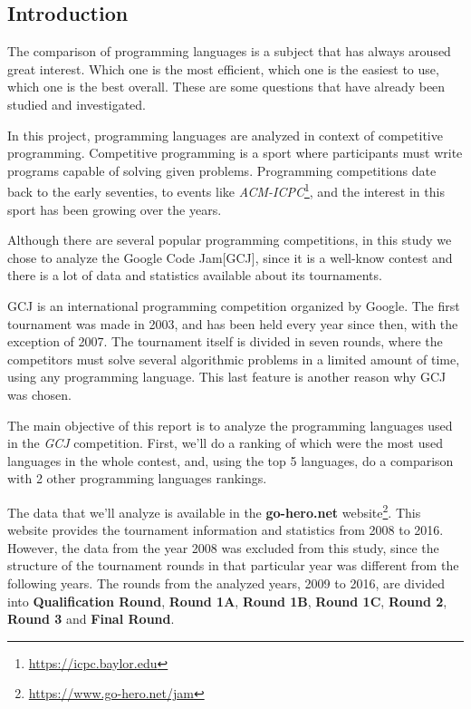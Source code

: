 \documentclass{article}
\begin{document}
\begin{multicols*}{2}


\section{Introduction}
The comparison of programming languages is a subject that has always aroused great interest. Which one is the most efficient, which one is the easiest to use, which one is the best overall. These are some questions that have already been studied and investigated.

In this project, programming languages are analyzed in context of competitive programming.
Competitive programming is a sport where participants must write programs capable of solving given problems\cite{wiki_comp}. Programming competitions date back to the early seventies, to events like \textit{ACM-ICPC}\footnote{\url{https://icpc.baylor.edu}}, and the interest in this sport has been growing over the years.

Although there are several popular programming competitions, in this study we chose to analyze the Google Code Jam[GCJ], since it is a well-know contest and there is a lot of data and statistics available about its tournaments.

GCJ is an international programming competition\cite{gcj} organized by Google.
The first tournament was made in 2003, and has been held every year since then, with the exception of 2007. The tournament itself is divided in seven rounds, where the competitors must solve several algorithmic problems in a limited amount of time, using any programming language. This last feature is another reason why GCJ was chosen.


The main objective of this report is to analyze the programming languages used in the \textit{GCJ} competition. First, we'll do a ranking of which were the most used languages in the whole contest, and, using the top 5 languages, do a comparison with 2 other programming languages rankings.

The data that we'll analyze is available in the \textbf{go-hero.net} website\footnote{\url{https://www.go-hero.net/jam}}. This website provides the tournament information\cite{go-hero} and statistics from 2008 to 2016. However, the data from the year 2008 was excluded from this study, since the structure of the tournament rounds in that particular year was different from the following years. The rounds from the analyzed years, 2009 to 2016, are divided into \textbf{Qualification Round}, \textbf{Round 1A}, \textbf{Round 1B}, \textbf{Round 1C}, \textbf{Round 2}, \textbf{Round 3} and \textbf{Final Round}.


\end{multicols*}
\end{document}
